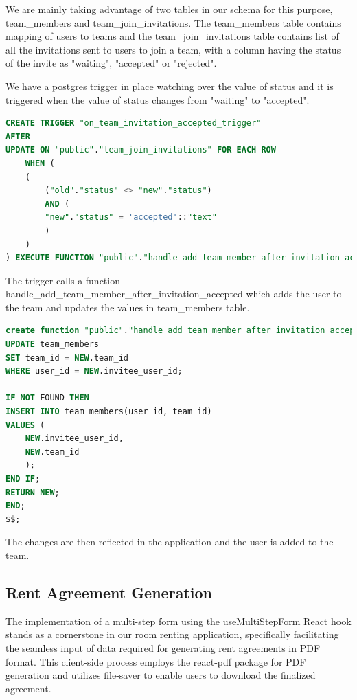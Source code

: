 We are mainly taking advantage of two tables in our schema for this purpose, team\_members and team\_join\_invitations. The team\_members table
contains mapping of users to teams and the team\_join\_invitations table contains list of all the invitations sent to users to join a team, with a column
having the status of the invite as "waiting", "accepted" or "rejected".\par
\medskip
\noindent We have a postgres trigger in place watching over the value of status and it is triggered when the value of status changes from "waiting" to "accepted".

\begin{lstlisting}[language=sql]
CREATE TRIGGER "on_team_invitation_accepted_trigger"
AFTER
UPDATE ON "public"."team_join_invitations" FOR EACH ROW
    WHEN (
    (
        ("old"."status" <> "new"."status")
        AND (
        "new"."status" = 'accepted'::"text"
        )
    )
) EXECUTE FUNCTION "public"."handle_add_team_member_after_invitation_accepted"();
\end{lstlisting}

\noindent The trigger calls a function handle\_add\_team\_member\_after\_invitation\_accepted which adds the user to the team and updates the values in team\_members table.
\begin{lstlisting}[language=sql]
create function "public"."handle_add_team_member_after_invitation_accepted" () returns "trigger" language "plpgsql" security definer as $$BEGIN
UPDATE team_members
SET team_id = NEW.team_id
WHERE user_id = NEW.invitee_user_id;
    
IF NOT FOUND THEN
INSERT INTO team_members(user_id, team_id)
VALUES (
    NEW.invitee_user_id,
    NEW.team_id
    );
END IF;
RETURN NEW;
END;
$$;
\end{lstlisting}

\noindent The changes are then reflected in the application and the user is added to the team.

\subsection{Rent Agreement Generation}

The implementation of a multi-step form using the useMultiStepForm React hook stands as a cornerstone in our room renting application, specifically facilitating the seamless input of data required for generating rent agreements in PDF format. This client-side process employs the react-pdf package for PDF generation and utilizes file-saver to enable users to download the finalized agreement.\par\medskip

